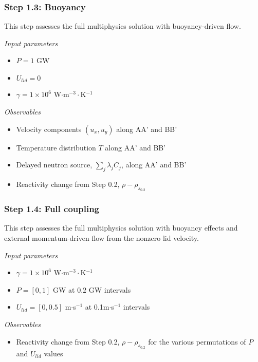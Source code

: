 \subsubsection{Step 1.3: Buoyancy}

This step assesses the full multiphysics solution with buoyancy-driven flow. 

\textit{Input parameters}
%
\begin{itemize}
    \itemsep0em
    \item $P = 1$ GW
    \item $U_{lid} = 0$
    \item $\gamma = 1 \times 10^6$ W$\cdot$m$^{-3}\cdot$K$^{-1}$
\end{itemize}

\textit{Observables}
\begin{itemize}
    \itemsep0em
    \item Velocity components $(u_x, u_y)$ along AA' and BB'
    \item Temperature distribution $T$ along AA' and BB'
    \item Delayed neutron source, $\sum_j \lambda_j C_j$, along AA' and BB'
    \item Reactivity change from Step 0.2, $\rho - \rho_{s_{0.2}}$
\end{itemize}

\subsubsection{Step 1.4: Full coupling}

This step assesses the full multiphysics solution with buoyancy effects
and external momentum-driven flow from the nonzero lid velocity.

\textit{Input parameters}
%
\begin{itemize}
    \itemsep0em
    \item $\gamma = 1 \times 10^6$ W$\cdot$m$^{-3}\cdot$K$^{-1}$
    \item $P = [0, 1]$ GW at $0.2$ GW intervals
    \item $U_{lid} = [0, 0.5]$ m$\cdot$s$^{-1}$ at 0.1m$\cdot$s$^{-1}$
    intervals
\end{itemize}

\textit{Observables}
\begin{itemize}
    \itemsep0em
    \item Reactivity change from Step 0.2, $\rho - \rho_{s_{0.2}}$ for the
    various permutations of $P$ and $U_{lid}$ values
\end{itemize}

